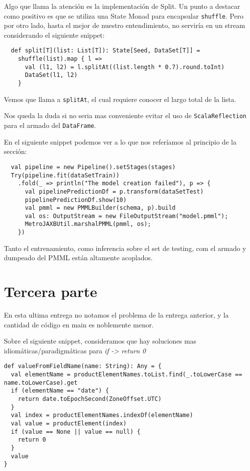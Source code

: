 \documentclass{article}
\begin{document}
Algo que llama la atención es la implementación de Split. Un punto a destacar como positivo es que se utiliza una State Monad para encapsular \texttt{shuffle}. Pero por otro lado, hasta el mejor de nuestro entendimiento, no serviría en un stream considerando el siguiente snippet:

\begin{verbatim}
  def split[T](list: List[T]): State[Seed, DataSet[T]] =
    shuffle(list).map { l =>
      val (l1, l2) = l.splitAt((list.length * 0.7).round.toInt)
      DataSet(l1, l2)
    }
\end{verbatim}

Vemos que llama a \texttt{splitAt}, el cual requiere conocer el largo total de la lista.

Nos queda la duda si no seria mas conveniente evitar el uso de \texttt{ScalaReflection} para el armado del \texttt{DataFrame}.

En el siguiente snippet podemos ver a lo que nos referíamos al principio de la sección:

\begin{verbatim}
  val pipeline = new Pipeline().setStages(stages)
  Try(pipeline.fit(dataSetTrain))
    .fold(_ => println("The model creation failed"), p => {
      val pipelinePredictionDf = p.transform(dataSetTest)
      pipelinePredictionDf.show(10)
      val pmml = new PMMLBuilder(schema, p).build
      val os: OutputStream = new FileOutputStream("model.pmml");
      MetroJAXBUtil.marshalPMML(pmml, os);
    })
\end{verbatim}

Tanto el entrenamiento, como inferencia sobre el set de testing, com el armado y dumpeado del PMML están altamente acoplados.

\section{Tercera parte}
En esta ultima entrega no notamos el problema de la entrega anterior, y la cantidad de código en main es noblemente menor.

Sobre el siguiente snippet, consideramos que hay soluciones mas idiomáticas/paradigmáticas para \textsl{if -> return 0}

\begin{verbatim}
def valueFromFieldName(name: String): Any = {
  val elementName = productElementNames.toList.find(_.toLowerCase == name.toLowerCase).get
  if (elementName == "date") {
    return date.toEpochSecond(ZoneOffset.UTC)
  }
  val index = productElementNames.indexOf(elementName)
  val value = productElement(index)
  if (value == None || value == null) {
    return 0
  }
  value
}
\end{verbatim}
\end{document}

